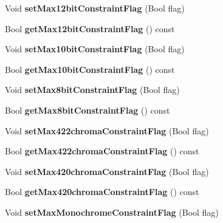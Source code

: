 \begin{DoxyCompactItemize}
Void {\bfseries set\+Max12bit\+Constraint\+Flag} (Bool flag)
\item 
\mbox{\label{class_profile_tier_level_a1d3fe3f9304bfec7cdd9a5800e13d361}} 
Bool {\bfseries get\+Max12bit\+Constraint\+Flag} () const
\item 
\mbox{\label{class_profile_tier_level_af107d85a6ae02448c0d7ef5b2e9b8d8d}} 
Void {\bfseries set\+Max10bit\+Constraint\+Flag} (Bool flag)
\item 
\mbox{\label{class_profile_tier_level_af8faa4fd9fbcdf9d054a19c6af368c21}} 
Bool {\bfseries get\+Max10bit\+Constraint\+Flag} () const
\item 
\mbox{\label{class_profile_tier_level_acfe0585d45a6956fac8308fe5f0ef3ff}} 
Void {\bfseries set\+Max8bit\+Constraint\+Flag} (Bool flag)
\item 
\mbox{\label{class_profile_tier_level_afb9390eeb0956c598a497136620c9734}} 
Bool {\bfseries get\+Max8bit\+Constraint\+Flag} () const
\item 
\mbox{\label{class_profile_tier_level_a09cc860621803d32d29874450aee2c17}} 
Void {\bfseries set\+Max422chroma\+Constraint\+Flag} (Bool flag)
\item 
\mbox{\label{class_profile_tier_level_aaac61e70f6121773ed6fe4fb9e875622}} 
Bool {\bfseries get\+Max422chroma\+Constraint\+Flag} () const
\item 
\mbox{\label{class_profile_tier_level_a4e9ec8243ec66ecc41f9a76e19d491a3}} 
Void {\bfseries set\+Max420chroma\+Constraint\+Flag} (Bool flag)
\item 
\mbox{\label{class_profile_tier_level_a7bc6ed2377c0cc2532497d06088f36e7}} 
Bool {\bfseries get\+Max420chroma\+Constraint\+Flag} () const
\item 
\mbox{\label{class_profile_tier_level_a2d5abc7e79bf431025db14449f3636e8}} 
Void {\bfseries set\+Max\+Monochrome\+Constraint\+Flag} (Bool flag)

\end{DoxyCompactItemize}
